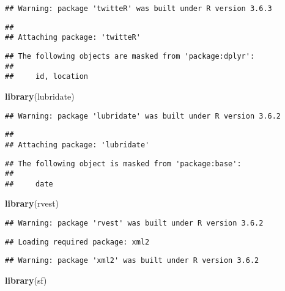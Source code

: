 \documentclass[
]{article}
\newenvironment{Shaded}{\begin{snugshade}}{\end{snugshade}}
\newcommand{\KeywordTok}[1]{\textcolor[rgb]{0.13,0.29,0.53}{\textbf{#1}}}
\newcommand{\NormalTok}[1]{#1}
\begin{document}
\begin{verbatim}
## Warning: package 'twitteR' was built under R version 3.6.3
\end{verbatim}

\begin{verbatim}
## 
## Attaching package: 'twitteR'
\end{verbatim}

\begin{verbatim}
## The following objects are masked from 'package:dplyr':
## 
##     id, location
\end{verbatim}

\begin{Shaded}
\begin{Highlighting}[]
\KeywordTok{library}\NormalTok{(lubridate)}
\end{Highlighting}
\end{Shaded}

\begin{verbatim}
## Warning: package 'lubridate' was built under R version 3.6.2
\end{verbatim}

\begin{verbatim}
## 
## Attaching package: 'lubridate'
\end{verbatim}

\begin{verbatim}
## The following object is masked from 'package:base':
## 
##     date
\end{verbatim}

\begin{Shaded}
\begin{Highlighting}[]
\KeywordTok{library}\NormalTok{(rvest)}
\end{Highlighting}
\end{Shaded}

\begin{verbatim}
## Warning: package 'rvest' was built under R version 3.6.2
\end{verbatim}

\begin{verbatim}
## Loading required package: xml2
\end{verbatim}

\begin{verbatim}
## Warning: package 'xml2' was built under R version 3.6.2
\end{verbatim}

\begin{Shaded}
\begin{Highlighting}[]
\KeywordTok{library}\NormalTok{(sf)}
\end{Highlighting}
\end{Shaded}
\end{document}
